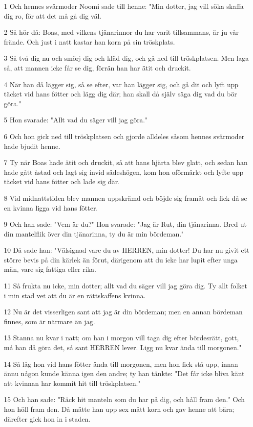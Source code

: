 \par 1 Och hennes svärmoder Noomi sade till henne: "Min dotter, jag vill söka skaffa dig ro, för att det må gå dig väl.
\par 2 Så hör då: Boas, med vilkens tjänarinnor du har varit tillsammans, är ju vår frände. Och just i natt kastar han korn på sin tröskplats.
\par 3 Så två dig nu och smörj dig och kläd dig, och gå ned till tröskplatsen. Men laga så, att mannen icke får se dig, förrän han har ätit och druckit.
\par 4 När han då lägger sig, så se efter, var han lägger sig, och gå dit och lyft upp täcket vid hans fötter och lägg dig där; han skall då själv säga dig vad du bör göra."
\par 5 Hon svarade: "Allt vad du säger vill jag göra."
\par 6 Och hon gick ned till tröskplatsen och gjorde alldeles såsom hennes svärmoder hade bjudit henne.
\par 7 Ty när Boas hade ätit och druckit, så att hans hjärta blev glatt, och sedan han hade gått åstad och lagt sig invid sädeshögen, kom hon oförmärkt och lyfte upp täcket vid hans fötter och lade sig där.
\par 8 Vid midnattstiden blev mannen uppskrämd och böjde sig framåt och fick då se en kvinna ligga vid hans fötter.
\par 9 Och han sade: "Vem är du?" Hon svarade: "Jag är Rut, din tjänarinna. Bred ut din mantelflik över din tjänarinna, ty du är min bördeman."
\par 10 Då sade han: "Välsignad vare du av HERREN, min dotter! Du har nu givit ett större bevis på din kärlek än förut, därigenom att du icke har lupit efter unga män, vare sig fattiga eller rika.
\par 11 Så frukta nu icke, min dotter; allt vad du säger vill jag göra dig. Ty allt folket i min stad vet att du är en rättskaffens kvinna.
\par 12 Nu är det visserligen sant att jag är din bördeman; men en annan bördeman finnes, som är närmare än jag.
\par 13 Stanna nu kvar i natt; om han i morgon vill taga dig efter bördesrätt, gott, må han då göra det, så sant HERREN lever. Ligg nu kvar ända till morgonen."
\par 14 Så låg hon vid hans fötter ända till morgonen, men hon fick stå upp, innan ännu någon kunde känna igen den andre; ty han tänkte: "Det får icke bliva känt att kvinnan har kommit hit till tröskplatsen."
\par 15 Och han sade: "Räck hit manteln som du har på dig, och håll fram den." Och hon höll fram den. Då mätte han upp sex mått korn och gav henne att bära; därefter gick hon in i staden.
